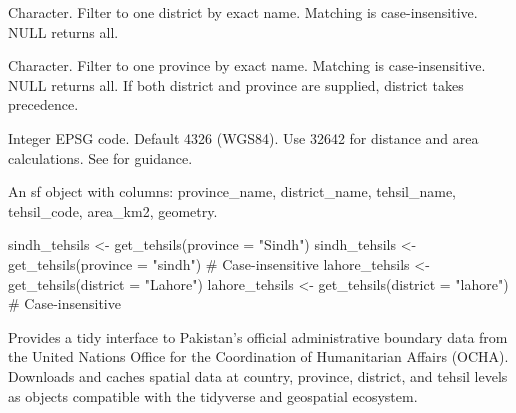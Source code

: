 \documentclass[a4paper]{book}
\begin{document}
%
\begin{Arguments}
\begin{ldescription}
\item[\code{district}] Character. Filter to one district by exact name.
Matching is case-insensitive. NULL returns all.

\item[\code{province}] Character. Filter to one province by exact name.
Matching is case-insensitive. NULL returns all.
If both district and province are supplied, district takes precedence.

\item[\code{crs}] Integer EPSG code. Default 4326 (WGS84). Use 32642 for
distance and area calculations. See  for guidance.
\end{ldescription}
\end{Arguments}
%
\begin{Value}
An sf object with columns: province\_name, district\_name,
tehsil\_name, tehsil\_code, area\_km2, geometry.
\end{Value}
%
\begin{Examples}
\begin{ExampleCode}

  sindh_tehsils  <- get_tehsils(province = "Sindh")
  sindh_tehsils  <- get_tehsils(province = "sindh")  # Case-insensitive
  lahore_tehsils <- get_tehsils(district = "Lahore")
  lahore_tehsils <- get_tehsils(district = "lahore")  # Case-insensitive

\end{ExampleCode}
\end{Examples}
%
\begin{Description}
Provides a tidy interface to Pakistan's official administrative
boundary data from the United Nations Office for the Coordination of
Humanitarian Affairs (OCHA). Downloads and caches spatial data at
country, province, district, and tehsil levels as  objects
compatible with the tidyverse and geospatial ecosystem.
\end{Description}
%
\end{document}

